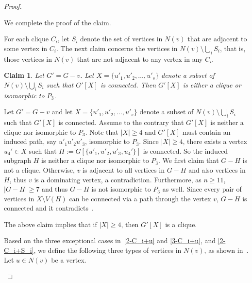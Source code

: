 \documentclass[a4paper,12pt]{article}
\theoremstyle{plain}
\newtheorem{claim}{Claim}[section]
\newenvironment{proof*}{\noindent \emph{Proof of the claim.}}{\hfill$\Diamond$}
\begin{document}
\begin{proof}
\begin{proof*}
\medskip
We complete the proof of the claim.
\end{proof*}

\medskip
For each clique $C_i$, let $S_i$ denote the set of vertices in $N(v)$ that are adjacent to some vertex in $C_i$.
The next claim concerns the vertices in $N(v)\setminus \bigcup_{i}S_i$, that is, those vertices in $N(v)$ that are not adjacent to any vertex in any $C_i$.

\begin{claim}\label{claim:non-S_i-vertices}
Let $G'=G-v$. Let $X=\{u'_1, u'_2, \ldots, u'_s\}$ denote a subset of $N(v)\setminus \bigcup_{i}S_i$ such that $G'[X]$ is connected. Then $G'[X]$ is either a clique or isomorphic to $P_3$.
\end{claim}

\begin{proof*}
Let $G'=G-v$ and let $X=\{u'_1, u'_2, \ldots, u'_s\}$ denote a subset of $N(v)\setminus \bigcup_{i}S_i$ such that $G'[X]$ is connected. Assume to the contrary that $G'[X]$ is neither a clique nor isomorphic to $P_3$. Note that $|X|\geq 4$ and $G'[X]$ must contain an induced path, say $u'_1u'_2u'_3$, isomorphic to $P_3$. Since $|X|\geq 4$, there exists a vertex $u_4'\in X$ such that $H:=G[\{u'_1,u'_2,u'_3,u_4'\}]$ is connected. So the induced subgraph $H$ is neither a clique nor isomorphic to $P_3$. We first claim that $G-H$ is not a clique. Otherwise, $v$ is adjacent to all vertices in $G-H$ and also vertices in $H$, thus $v$ is a dominating vertex, a contradiction. 
Furthermore, as $n\geq 11$, $|G-H|\geq 7$ and thus $G-H$ is not isomorphic to $P_3$ as well. Since every pair of vertices in $X\setminus V(H)$ can be connected via a path through the vertex $v$, $G-H$ is connected and it contradicts~. 
\end{proof*}

The above claim implies that if $|X|\geq 4$, then $G'[X]$ is a clique. 



\medskip
Based on the three exceptional cases in~\ref{2-C_i+u} and \ref{3-C_i+u}, and \ref{2-C_i+S_i}, we define the following three types of vertices in $N(v)$, as shown in~. Let $u\in N(v)$ be a vertex.

\begin{figure}[ht]
\centering
\begin{tikzpicture}[
  every node/.style={draw,circle,fill=black,inner sep=1.5pt},
  xscale=1.5
]


\end{tikzpicture}
\end{figure}
\end{proof}
\end{document}
